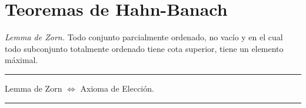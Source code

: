 \section*{Teoremas de Hahn-Banach}

\begin{proposition}
    \emph{Lemma de Zorn.} Todo conjunto parcialmente ordenado, no vacío y en el cual todo subconjunto totalmente ordenado tiene cota superior, tiene un elemento máximal. 
\end{proposition}

\E

\hrule
\begin{exercise}
    Lemma de Zorn \(\Leftrightarrow \) Axioma de Elección. 
\end{exercise}
\hrule 

\E

